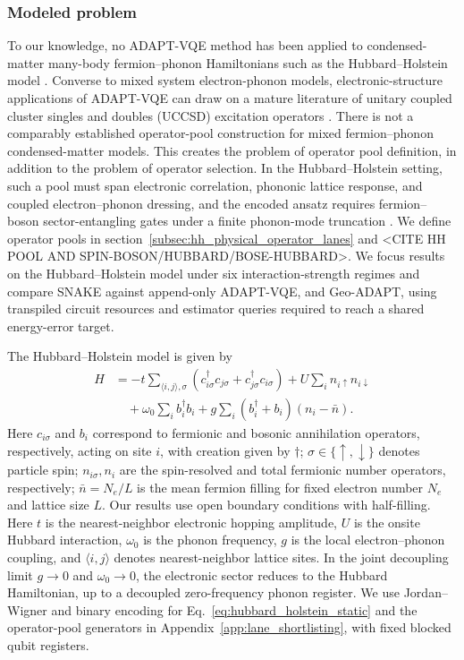 \documentclass[
  reprint,
  amsmath,
  amssymb,
  aps,
  pra,
  nofootinbib,
  superscriptaddress,
  floatfix
]{revtex4-2}
\begin{document}
\subsubsection{Modeled problem}
To our knowledge, no ADAPT-VQE method has been applied to condensed-matter many-body fermion--phonon Hamiltonians such as the Hubbard--Holstein model \cite{Macridin2018,Li2023,Denner2023,Majland2024vADAPT}. Converse to mixed system electron-phonon models, electronic-structure applications of ADAPT-VQE can draw on a mature literature of unitary coupled cluster singles and doubles (UCCSD) excitation operators \cite{Romero2018UCC,Grimsley2019}. There is not a comparably established operator-pool construction for mixed fermion--phonon condensed-matter models. This creates the problem of operator pool definition, in addition to the problem of operator selection. In the Hubbard--Holstein setting, such a pool must span electronic correlation, phononic lattice response, and coupled electron--phonon dressing, and the encoded ansatz requires fermion--boson sector-entangling gates under a finite phonon-mode truncation \cite{Hubbard1963,Holstein1959a,Holstein1959b}. We define operator pools in section~\ref{subsec:hh_physical_operator_lanes} and <CITE HH POOL AND SPIN-BOSON/HUBBARD/BOSE-HUBBARD>. We focus results on the Hubbard--Holstein model under six interaction-strength regimes and compare SNAKE against append-only ADAPT-VQE, and Geo-ADAPT, using transpiled circuit resources and estimator queries required to reach a shared energy-error target.


The Hubbard--Holstein model is given by
\begin{align}
H
&=-t\sum_{\langle i,j\rangle,\sigma}
(c_{i\sigma}^{\dagger}c_{j\sigma}+c_{j\sigma}^{\dagger}c_{i\sigma})
+U\sum_i n_{i\uparrow}n_{i\downarrow}
\nonumber\\
&\quad+\omega_0\sum_i b_i^\dagger b_i
+g\sum_i(b_i^\dagger+b_i)(n_i-\bar n).
\label{eq:hubbard_holstein_static}
\end{align}
Here \(c_{i\sigma}\) and \(b_i\) correspond to fermionic and bosonic annihilation operators, respectively, acting on site $i$, with creation given by $\dagger$; $\sigma \in\{\uparrow, \downarrow\}$ denotes particle spin;
\(n_{i\sigma}, n_i\) are the spin-resolved and total fermionic number operators, respectively; \(\bar n=N_e/L\) is the mean fermion filling for fixed electron number \(N_e\) and lattice size \(L\). Our results use open boundary conditions with half-filling. Here \(t\) is the nearest-neighbor electronic hopping amplitude, \(U\) is the onsite Hubbard interaction, \(\omega_0\) is the phonon frequency, \(g\) is the local electron--phonon coupling, and \(\langle i,j\rangle\) denotes nearest-neighbor lattice sites.
In the joint decoupling limit $g\to0$ and $\omega_0\to0$, the electronic sector reduces to the Hubbard Hamiltonian, up to a decoupled zero-frequency phonon register. We use Jordan--Wigner and binary encoding for Eq.~\eqref{eq:hubbard_holstein_static} and the operator-pool generators in Appendix~\ref{app:lane_shortlisting}, with fixed blocked qubit registers.
\end{document}
